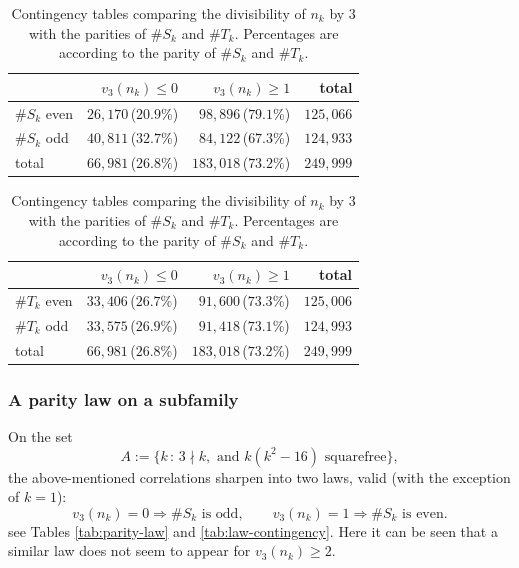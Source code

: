 \documentclass[12pt]{amsart}%
\newcommand{\countpct}[2]{%
  #1\,{\scriptsize(#2\%)}%
}
\newcommand{\1}{\mathds{1}}
\theoremstyle{definition}
\numberwithin{equation}{section}
\numberwithin{table}{section}
\numberwithin{figure}{section}
\begin{document}
\begin{table}[ht]
  \centering
  \small
  \setlength{\tabcolsep}{4pt}

  \begin{tabular}{lrrr}
    \toprule
    & $v_3(n_k) \leq 0$ & $v_3(n_k)\geq 1$ & total \\
    \midrule
    $\#S_k$ even
    & \countpct{$26{,}170$}{$20.9$}
    & \countpct{$98{,}896$}{$79.1$}
    & $125{,}066$ \\
    $\#S_k$ odd
    & \countpct{$40{,}811$}{$32.7$}
    & \countpct{$84{,}122$}{$67.3$}
    & $124{,}933$ \\
    \midrule
    total
    & \countpct{$66{,}981$}{$26.8$}
    & \countpct{$183{,}018$}{$73.2$}
    & $249{,}999$ \\
    \bottomrule
  \end{tabular}
\qquad
  \begin{tabular}{lrrr}
    \toprule
    & $v_3(n_k) \leq 0$ & $v_3(n_k)\geq 1$ & total \\
    \midrule
    $\#T_k$ even
    & \countpct{$33{,}406$}{$26.7$}
    & \countpct{$91{,}600$}{$73.3$}
    & $125{,}006$ \\
    $\#T_k$ odd
    & \countpct{$33{,}575$}{$26.9$}
    & \countpct{$91{,}418$}{$73.1$}
    & $124{,}993$ \\
    \midrule
    total
    & \countpct{$66{,}981$}{$26.8$}
    & \countpct{$183{,}018$}{$73.2$}
    & $249{,}999$ \\
    \bottomrule
  \end{tabular}

  \caption{Contingency tables comparing the divisibility of $n_k$ by $3$ with the parities of $\#S_k$ and $\#T_k$. Percentages are according to the parity of
$\#S_k$ and $\#T_k$.}
  \label{tab:contingency_parity_S_T}
\end{table}


\subsubsection{A parity law on a subfamily}
\label{ssec:partitylaw}

On the set
\begin{equation}
\label{def:setA}
A := \{ k \, \colon \, 3\nmid k, \text{ and } k(k^2-16)\text{ squarefree} \},
\end{equation}
the above-mentioned correlations sharpen into two laws, valid (with the exception of $k = 1$):
\begin{equation}\label{eq:thelawforA}
v_3(n_k)=0 \Longrightarrow \#S_k \text{ is odd},
\qquad
v_3(n_k)=1 \Longrightarrow \#S_k \text{ is even}.
\end{equation}
see Tables \ref{tab:parity-law} and \ref{tab:law-contingency}. Here it can be seen that a similar law does not seem to appear for $v_3(n_k) \geq 2$.
\end{document}
